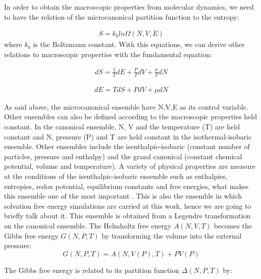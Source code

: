 In order to obtain the macroscopic properties from molecular dynamics, we need to have the relation of the microcanonical partition function to the entropy:

\begin{equation}
\begin{aligned}
S = k_{b} ln \Omega (N,V,E) 
\end{aligned}
\end{equation}
where $k_{b}$ is the Boltzmann constant. With this equations, we can derive other relations to macroscopic properties with the fundamental equation:

\begin{equation}
\begin{aligned}
dS = \frac{1}{T} dE + \frac{P}{T} dV + \frac{\mu}{T} dN
\end{aligned}
\end{equation}

\begin{equation}
\begin{aligned}
dE = T dS + P dV + \mu dN
\end{aligned}
\end{equation}

As said above, the microcanonical ensemble  have  N,V,E as its control variable. Other ensembles can also be defined according to the macroscopic properties held constant.  In the canonical ensemble,  N, V and the temperature (T) are held constant and  N, pressure (P) and T are held constant in the isothermal-isobaric ensemble. Other ensembles include the isenthalpic-isobaric (constant number of particles, pressure and enthalpy) and the grand canonical (constant chemical potential, volume and temperature). A variety of physical properties are measure at the conditions of the isenthalpic-isobaric ensemble such as enthalpies, entropies, redox potential, equilibrium constants and free energies, what makes this ensemble one of the most important \cite{tuckerman}. This is also the ensemble in which solvation free energy simulations are carried at this work, hence we are going to briefly talk about it. This ensemble is obtained from a Legendre transformation on the canonical ensemble. The Helmholtz free energy $A(N,V,T)$ becomes the Gibbs free energy $G(N,P,T)$ by transforming the volume into the external pressure:
\begin{equation}
G(N,P,T) = A(N,V(P),T) + PV(P)
\end{equation}


The Gibbs free energy is related to its partition function $\Delta (N,P,T)$ by:

